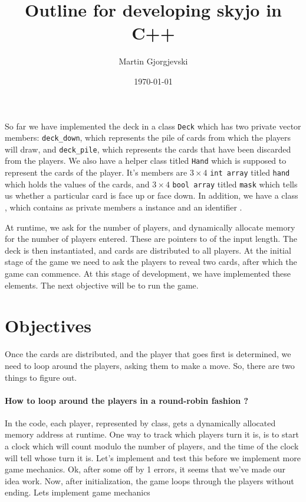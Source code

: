 \documentclass[11pt]{article}
\title{Outline for developing skyjo in C++}
\author{Martin Gjorgjevski}
\date{\today}
\newcommand\dd[2]{\texttt{\detokenize{#1}} #2}
\begin{document}
\maketitle
So far we have implemented the deck in a class \verb!Deck! 
which has two private vector members: \verb!deck_down!, which represents
the pile of cards from which the players will draw, and \verb!deck_pile!, which 
represents the cards that have been discarded from the players. We also have a helper 
class titled \verb!Hand! which is supposed to represent the cards of the player.
It's members are $3\times 4$ \verb!int array! titled \verb!hand! which holds the values 
of the cards, and $3\times 4$ \verb!bool array! titled \verb!mask! which tells us whether 
a particular card is face up or face down. In addition, we have a class \dd{Player}, which 
contains as private members a \dd{Hand} instance and an identifier \dd{id}.

    At runtime, we ask for the number of players, and dynamically allocate memory for the number of players entered.
These are pointers to \dd{Player} of the input length. The deck is then instantiated, and cards are distributed 
to all players. At the initial stage of the game we need to ask the players to reveal two cards, after which the 
game can commence. At this stage of development, we have implemented these elements. The next objective will be to 
run the game.

\section{Objectives}

Once the cards are distributed, and the player that goes first is determined, we need to loop around the players, 
asking them to make a move.
So, there are two things to figure out.
\paragraph{How to loop around the players in a round-robin fashion ?}
In the code, each player, represented by \dd{Player} class, gets a dynamically allocated memory address at runtime.
One way to track which players turn it is, is to start a clock which will count modulo the number of players, and the 
time of the clock will tell whose turn it is. Let's implement and test this before we implement more game mechanics.
Ok, after some off by 1 errors, it seems that we've made our idea work. Now, after initialization, the game loops through the 
players without ending. Lets implement game mechanics
\end{document}
